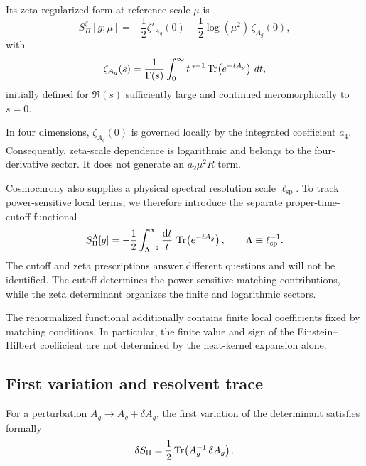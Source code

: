 \documentclass[pdflatex,sn-mathphys-num]{sn-jnl} %
\theoremstyle{remark}
\theoremstyle{plain}
\begin{document}
    Its zeta-regularized form at reference scale $\mu$ is
    \begin{equation}
      S_\Pi^{\zeta}[g;\mu]
      =
      -\frac12\zeta'_{A_g}(0)
      -\frac12\log(\mu^2)\,\zeta_{A_g}(0),
      \label{eq:zeta-functional}
    \end{equation}
    with
    \begin{equation}
      \zeta_{A_g}(s)
      =
      \frac{1}{\Gamma(s)}
      \int_0^\infty
      t^{\,s-1}
      \Tr\!\left(e^{-tA_g}\right)\,dt ,
    \end{equation}
    initially defined for $\Re(s)$ sufficiently large and continued meromorphically to $s=0$.

    In four dimensions, $\zeta_{A_g}(0)$ is governed locally by the integrated coefficient $a_4$.
    Consequently, zeta-scale dependence is logarithmic and belongs to the four-derivative sector.
    It does not generate an $a_2\mu^2R$ term.

    Cosmochrony also supplies a physical spectral resolution scale
    $\ell_{\mathrm{sp}}$.
    To track power-sensitive local terms, we therefore introduce the separate proper-time-cutoff functional
    \begin{equation}
      S_\Pi^{\Lambda}[g]
      =
      -\frac12
      \int_{\Lambda^{-2}}^\infty
      \frac{\dd t}{t}\,
      \Tr\!\left(e^{-tA_g}\right),
      \qquad
      \Lambda\equiv\ell_{\mathrm{sp}}^{-1}.
      \label{eq:cutoff-functional}
    \end{equation}
    The cutoff and zeta prescriptions answer different questions and will not be identified.
    The cutoff determines the power-sensitive matching contributions, while the zeta determinant organizes the finite
    and logarithmic sectors.

    The renormalized functional additionally contains finite local coefficients fixed by matching conditions.
    In particular, the finite value and sign of the Einstein--Hilbert coefficient are not determined by the heat-kernel
    expansion alone.

  \subsection{First variation and resolvent trace}
    \label{subsec:first-variation}

    For a perturbation $A_g \to A_g + \delta A_g$, the first variation of the determinant satisfies formally
    \begin{equation}
      \delta S_\Pi
      =
      \frac12 \Tr\!\left(A_g^{-1}\,\delta A_g\right) .
    \end{equation}
\end{document}
